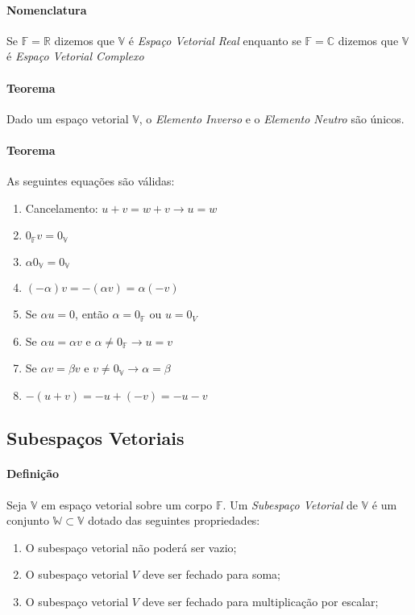 \documentclass{article}
\begin{document}
        \paragraph{Nomenclatura}Se $\mathbb{F}=\mathbb{R}$ dizemos que $\mathbb{V}$ é \textit{Espaço Vetorial Real} enquanto se $\mathbb{F}=\mathbb{C}$ dizemos que $\mathbb{V}$ é \textit{Espaço Vetorial Complexo}
        
        \paragraph{Teorema}Dado um espaço vetorial $\mathbb{V}$, o \textit{Elemento Inverso} e o \textit{Elemento Neutro} são únicos.

        \paragraph{Teorema}As seguintes equações são válidas:
            \begin{enumerate}[noitemsep]
                \item Cancelamento: $u+v=w+v \rightarrow u=w$
                \item $0_{\mathbb{F}}v=0_{\mathbb{V}}$
                \item $\alpha 0_{\mathbb{V}}=0_{\mathbb{V}}$
                \item $(-\alpha)v=-(\alpha v)=\alpha(-v)$
                \item Se $\alpha u = 0$, então $\alpha=0_{\mathbb{F}}$ ou $u=0_{V}$
                \item Se $\alpha u = \alpha v$ e $\alpha \neq 0_{\mathbb{F}} \rightarrow u=v$
                \item Se $\alpha v = \beta v$ e $v\neq 0_{\mathbb{V}} \rightarrow \alpha =\beta$
                \item $-(u+v)=-u+(-v)=-u-v$
            \end{enumerate}
        
        \subsection{Subespaços Vetoriais}
            \paragraph{Definição}Seja $\mathbb{V}$ em espaço vetorial sobre um corpo $\mathbb{F}$. Um \textit{Subespaço Vetorial} de $\mathbb{V}$ é um conjunto $\mathbb{W} \subset \mathbb{V}$ dotado das seguintes propriedades:
                \begin{enumerate}[noitemsep]
                    \item O subespaço vetorial não poderá ser vazio;
                    \item O subespaço vetorial $V$ deve ser fechado para soma;
                    \item O subespaço vetorial $V$ deve ser fechado para multiplicação por escalar;
                \end{enumerate}
\end{document}
